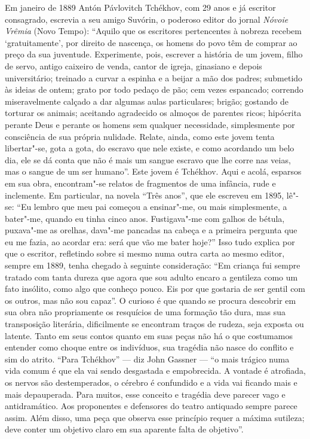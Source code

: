 Em janeiro de 1889 Antón Pávlovitch Tchékhov, com 29 anos e já escritor
consagrado, escrevia a seu amigo Suvórin, o poderoso editor do jornal
\emph{Nóvoie Vrêmia} (Novo Tempo): ``Aquilo que os escritores pertencentes à
nobreza recebem `gratuitamente', por direito de nascença, os homens do
povo têm de comprar ao preço da sua juventude. Experimente, pois,
escrever a história de um jovem, filho de servo, antigo caixeiro de
venda, cantor de igreja, ginasiano e depois universitário; treinado a
curvar a espinha e a beijar a mão dos padres; submetido às ideias de
ontem; grato por todo pedaço de pão; cem vezes espancado; correndo
miseravelmente calçado a dar algumas aulas particulares; brigão;
gostando de torturar os animais; aceitando agradecido os almoços de
parentes ricos; hipócrita perante Deus e perante os homens sem qualquer
necessidade, simplesmente por consciência de sua própria nulidade.
Relate, ainda, como este jovem tenta libertar"-se, gota a gota, do
escravo que nele existe, e como acordando um belo dia, ele se dá conta
que não é mais um sangue escravo que lhe corre nas veias, mas o sangue
de um ser humano''. Este jovem é Tchékhov. Aqui e acolá, esparsos em sua
obra, encontram"-se relatos de fragmentos de uma infância, rude e
inclemente. Em particular, na novela ``Três anos'', que ele escreveu em
1895, lê"-se: ``Eu lembro que meu pai começou a ensinar"-me, ou mais
simplesmente, a bater"-me, quando eu tinha cinco anos. Fustigava"-me com
galhos de bétula, puxava"-me as orelhas, dava"-me pancadas na cabeça e a
primeira pergunta que eu me fazia, ao acordar era: será que vão me
bater hoje?'' Isso tudo explica por que o escritor, refletindo sobre si
mesmo numa outra carta ao mesmo editor, sempre em 1889, tenha chegado à
seguinte consideração: ``Em criança fui sempre tratado com tanta dureza
que agora que sou adulto encaro a gentileza como um fato insólito, como
algo que conheço pouco. Eis por que gostaria de ser gentil com os
outros, mas não sou capaz''. O curioso é que quando se procura descobrir
em sua obra não propriamente os resquícios de uma formação tão dura, mas
sua transposição literária, dificilmente se encontram traços de rudeza,
seja exposta ou latente. Tanto em seus contos quanto em suas peças não
há o que costumamos entender como choque entre os indivíduos, sua
tragédia não nasce do conflito e sim do atrito. ``Para Tchékhov'' --- diz
John Gassner --- ``o mais trágico numa vida comum é que ela vai sendo
desgastada e empobrecida. A vontade é atrofiada, os nervos são
destemperados, o cérebro é confundido e a vida vai ficando mais e mais
depauperada. Para muitos, esse conceito e tragédia deve parecer vago e
antidramático. Aos proponentes e defensores do teatro antiquado sempre
parece assim. Além disso, uma peça que observa esse princípio requer a
máxima sutileza; deve conter um objetivo claro em sua aparente falta de
objetivo''.

